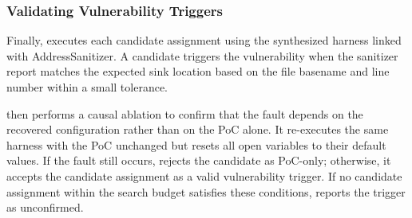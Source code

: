 

\subsubsection{Validating Vulnerability Triggers}\label{subsubsec:trigger}

Finally, \sys executes each candidate assignment using the synthesized harness linked with AddressSanitizer. A candidate triggers the vulnerability when the sanitizer report matches the expected sink location based on the file basename and line number within a small tolerance.

\sys then performs a causal ablation to confirm that the fault depends on the recovered configuration rather than on the PoC alone. It re-executes the same harness with the PoC unchanged but resets all open variables to their default values. If the fault still occurs, \sys rejects the candidate as PoC-only; otherwise, it accepts the candidate assignment as a valid vulnerability trigger.
%
If no candidate assignment within the search budget satisfies these conditions, \sys reports the trigger as unconfirmed.





